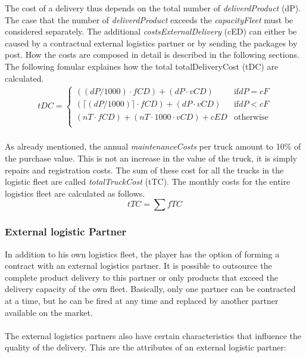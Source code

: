 The cost of a delivery thus depends on the total number of \textit{deliverdProduct} (\gls{dP}). 
The case that the number of \textit{deliverdProduct} exceeds the \textit{capacityFleet} must be considered separately. The additional \textit{costsExternalDelivery} (\gls{cED}) can either be caused by a contractual external logistics partner or by sending the packages by post. How the costs are composed in detail is described in the following sections. \\
The following fomular explaines how the total totalDeliveryCost (\gls{tDC}) are calculated. 
\begin{equation}
\label{func:deliveryCost}
\begin{aligned}
tDC = 
\begin{cases}
    (( dP / 1000) \cdot fCD) + ( dP \cdot vCD) & \text{if} dP = cF\\
    (\lceil (dP / 1000) \rceil \cdot fCD ) + ( dP \cdot vCD) & \text{if} dP < cF\\
    ( nT \cdot fCD ) + ( nT \cdot1000 \cdot vCD ) + cED & \text{otherwise}\\
\end{cases}
\end{aligned}
\end{equation}
\\
As already mentioned, the annual \textit{maintenanceCosts}  per truck amount to 10\% of the purchase value. This is not an increase in the value of the truck, it is simply repairs and registration costs. The sum of these cost for all the trucks in the logistic fleet are called \textit{totalTruckCost} (\gls{tTC}). The monthly costs for the entire logistics fleet are calculated as follows. 
\begin{equation}
    tTC = \sum fTC
\end{equation}


\subsubsection{External logistic Partner}
In addition to his own logistics fleet, the player has the option of forming a contract with an external logistics partner. It is possible to outsource the complete product delivery to this partner or only products that exceed the delivery capacity of the own fleet. Basically, only one partner can be contracted at a time, but he can be fired at any time and replaced by another partner available on the market. \\
\\
The external logistics partners also have certain characteristics that influence the quality of the delivery. This are the attributes of an external logistic partner:  

